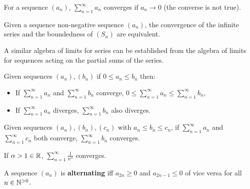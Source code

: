 \documentclass[../Year1.tex]{subfiles}
\begin{document}
\vspace{-23pt}

\begin{theorem}
    For a sequence $(a_n)$, $\displaystyle\sum_{n=1}^\infty a_n$ converges if $a_n\rightarrow0$ (the converse is not true).
\end{theorem}

\vspace{-15pt}

\begin{theorem}
    Given a sequence non-negative sequence $(a_n)$, the convergence of the infinite series and the boundedness of $(S_n)$ are equivalent.
\end{theorem}

\begin{theorem}
    A similar algebra of limits for series can be established from the algebra of limits for sequences acting on the partial sums of the series.
\end{theorem}

\begin{theorem}
    Given sequences $(a_n),(b_n)$ if $0\leq a_n \leq b_n$ then: \begin{itemize}
        \item If $\displaystyle\sum_{n=1}^\infty a_n$ and $\displaystyle\sum_{n=1}^\infty b_n$ converge, $0\leq \displaystyle\sum_{n=1}^\infty a_n \leq \displaystyle\sum_{n=1}^\infty b_n$,
        \item If $\displaystyle\sum_{n=1}^\infty a_n$ diverges, $\displaystyle\sum_{n=1}^\infty b_n$ also diverges.
    \end{itemize}
\end{theorem}

\begin{theorem}
    Given sequences $(a_n), (b_n), (c_n)$ with $a_n\leq b_n\leq c_n$, if $\displaystyle\sum_{n=1}^\infty a_n$ and $\displaystyle\sum_{n=1}^\infty c_n$ both converge, $\displaystyle\sum_{n=1}^\infty b_n$ converges.
\end{theorem}

\begin{theorem}
    If $\alpha>1\in\mathbb{R}$, $\displaystyle\sum_{n=1}^\infty \frac{1}{n^\alpha}$ converges.
\end{theorem}

\begin{definition}
    A sequence $(a_n)$ is \textbf{alternating} iff $a_{2n}\geq 0$ and $a_{2n-1}\leq0$ of vice versa for all $n\in\mathbb{N}^{>0}$.
\end{definition}
\end{document}
